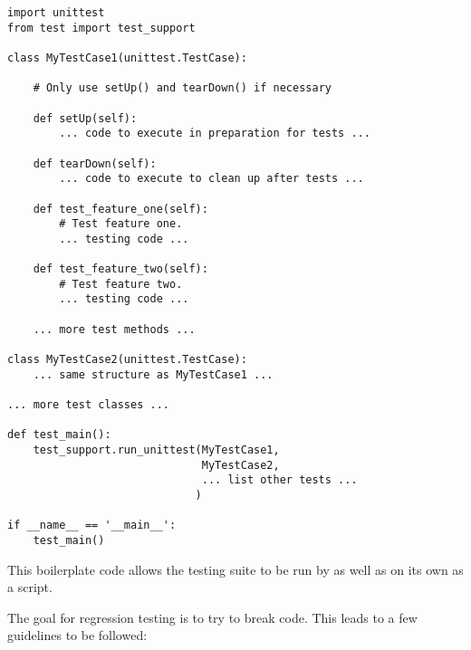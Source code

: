 \begin{verbatim}
import unittest
from test import test_support

class MyTestCase1(unittest.TestCase):

    # Only use setUp() and tearDown() if necessary

    def setUp(self):
        ... code to execute in preparation for tests ...

    def tearDown(self):
        ... code to execute to clean up after tests ...

    def test_feature_one(self):
        # Test feature one.
        ... testing code ...

    def test_feature_two(self):
        # Test feature two.
        ... testing code ...

    ... more test methods ...

class MyTestCase2(unittest.TestCase):
    ... same structure as MyTestCase1 ...

... more test classes ...

def test_main():
    test_support.run_unittest(MyTestCase1,
                              MyTestCase2,
                              ... list other tests ...
                             )

if __name__ == '__main__':
    test_main()
\end{verbatim}

This boilerplate code allows the testing suite to be run by 
as well as on its own as a script.

The goal for regression testing is to try to break code.
This leads to a few guidelines to be followed:

